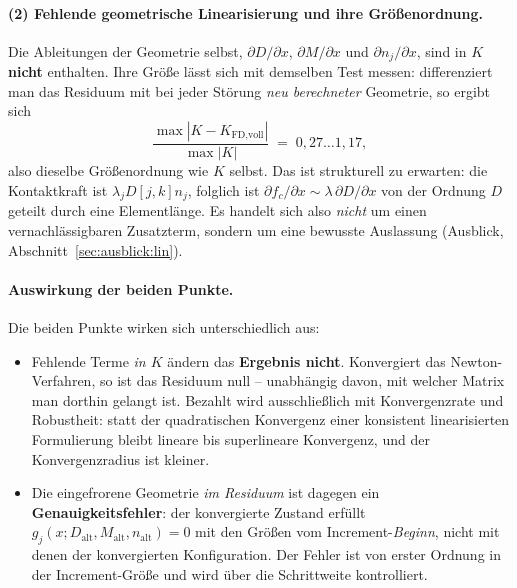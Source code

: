 \documentclass[a4paper,11pt]{article}
\def\bm#1{#1}%
\def\tilde#1{#1}%
\begin{document}
\paragraph{(2) Fehlende geometrische Linearisierung und ihre Größenordnung.}
Die Ableitungen der Geometrie selbst, $\partial\bm D/\partial\bm x$,
$\partial\bm M/\partial\bm x$ und $\partial\bm n_j/\partial\bm x$, sind in $\bm K$
\textbf{nicht} enthalten. Ihre Größe lässt sich mit demselben Test messen: differenziert man
das Residuum mit bei jeder Störung \emph{neu berechneter} Geometrie, so ergibt sich
\begin{equation}
\frac{\max|\bm K - \bm K_{\text{FD,voll}}|}{\max|\bm K|} \;=\; 0{,}27 \ldots 1{,}17 ,
\end{equation}
also dieselbe Größenordnung wie $\bm K$ selbst. Das ist strukturell zu erwarten: die
Kontaktkraft ist $\lambda_j\bm D[j,k]\bm n_j$, folglich ist
$\partial\bm f_c/\partial\bm x\sim\lambda\,\partial\bm D/\partial\bm x$ von der Ordnung
$\bm D$ geteilt durch eine Elementlänge. Es handelt sich also \emph{nicht} um einen
vernachlässigbaren Zusatzterm, sondern um eine bewusste Auslassung
(Ausblick, Abschnitt~\ref{sec:ausblick:lin}).

\paragraph{Auswirkung der beiden Punkte.} Die beiden Punkte wirken sich unterschiedlich aus:
\begin{itemize}\itemsep2pt
  \item Fehlende Terme \emph{in $\bm K$} ändern das \textbf{Ergebnis nicht}. Konvergiert das
        Newton-Verfahren, so ist das Residuum null -- unabhängig davon, mit welcher Matrix man
        dorthin gelangt ist. Bezahlt wird ausschließlich mit Konvergenzrate und Robustheit:
        statt der quadratischen Konvergenz einer konsistent linearisierten Formulierung bleibt
        lineare bis superlineare Konvergenz, und der Konvergenzradius ist kleiner.
  \item Die eingefrorene Geometrie \emph{im Residuum} ist dagegen ein
        \textbf{Genauigkeitsfehler}: der konvergierte Zustand erfüllt
        $\tilde g_j(\bm x;\bm D_{\text{alt}},\bm M_{\text{alt}},\bm n_{\text{alt}})=0$ mit den
        Größen vom Increment-\emph{Beginn}, nicht mit denen der konvergierten Konfiguration.
        Der Fehler ist von erster Ordnung in der Increment-Größe und wird über die Schrittweite
        kontrolliert.
\end{itemize}
\end{document}

